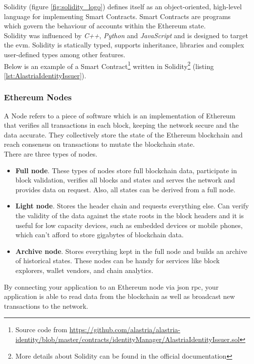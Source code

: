             Solidity (figure \ref{fig:solidity_logo}) defines itself as an object-oriented, high-level language for implementing Smart Contracts. Smart Contracts are programs which govern the behaviour of accounts within the Ethereum state.\\
            
            Solidity\cite{solidityGit} was influenced by \textit{C++}, \textit{Python} and \textit{JavaScript} and is designed to target the \acrfull{evm}. Solidity is statically typed, supports inheritance, libraries and complex user-defined types among other features.\\

            Below is an example of a Smart Contract\footnote{Source code from \url{https://github.com/alastria/alastria-identity/blob/master/contracts/identityManager/AlastriaIdentityIssuer.sol}} written in Solidity\footnote{More details about Solidity can be found in the official documentation\cite{solidity}} (listing  \ref{lst:AlastriaIdentityIssuer}).
            
            

        \subsubsection{Ethereum Nodes}
            A Node refers to a piece of software which is an implementation of Ethereum that verifies all transactions in each block, keeping the network secure and the data accurate. They collectively store the state of the Ethereum blockchain and reach consensus on transactions to mutate the blockchain state.\\
            
            There are three types of nodes.
            \begin{itemize}
                \item \textbf{Full node}. These types of nodes store full blockchain data, participate in block validation, verifies all blocks and states and serves the network and provides data on request. Also, all states can be derived from a full node.
                \item \textbf{Light node}. Stores the header chain and requests everything else. Can verify the validity of the data against the state roots in the block headers and it is useful for low capacity devices, such as embedded devices or mobile phones, which can't afford to store gigabytes of blockchain data.
                \item \textbf{Archive node}. Stores everything kept in the full node and builds an archive of historical states. These nodes can be handy for services like block explorers, wallet vendors, and chain analytics.
            \end{itemize}
            By connecting your application to an Ethereum node via \acrshort{json} \acrshort{rpc}, your application is able to read data from the blockchain as well as broadcast new transactions to the network.

